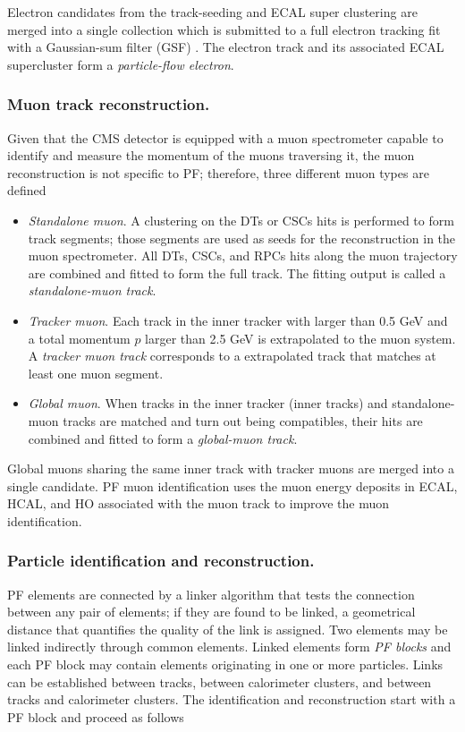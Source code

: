 Electron candidates from the track-seeding and ECAL super clustering are merged into a single collection which is submitted to a full electron tracking fit with a Gaussian-sum filter (GSF) \cite{gsf}. The electron track and its associated ECAL supercluster form a \textit{particle-flow electron}.

\subsubsection*{Muon track reconstruction.}

Given that the CMS detector is equipped with a muon spectrometer capable to identify and measure the momentum of the muons traversing it, the muon reconstruction is not specific to PF; therefore, three different muon types are defined

\begin{itemize}
\item \textit{Standalone muon}. A clustering on the DTs or CSCs hits is performed to form track segments; those segments are used as seeds for the reconstruction in the muon spectrometer. All DTs, CSCs, and RPCs hits along the muon trajectory are combined and fitted to form the full track. The fitting output is called a \textit{standalone-muon track}.
\item \textit{Tracker muon}. Each track in the inner tracker with \pt larger than 0.5 GeV and a total momentum $p$ larger than 2.5 GeV is extrapolated to the muon system. A \textit{tracker muon track} corresponds to a extrapolated track that matches at least one muon segment.
\item \textit{Global muon}. When tracks in the inner tracker (inner tracks) and standalone-muon tracks are matched and turn out being compatibles, their hits are combined and fitted to form a \textit{global-muon track}. 
\end{itemize}

Global muons sharing the same inner track with tracker muons are merged into a single candidate. PF muon identification uses the muon energy deposits in ECAL, HCAL, and HO associated with the muon track to improve the muon identification.

\subsubsection*{Particle identification and reconstruction.}

PF elements are connected by a linker algorithm that tests the connection between any pair of elements; if they are found to be linked, a geometrical distance that quantifies the quality of the link is assigned. Two elements may be linked indirectly through common elements. Linked elements form \textit{PF blocks} and each PF block may contain elements originating in one or more particles. Links can be established between tracks, between calorimeter clusters, and between tracks and calorimeter clusters. The identification and reconstruction start with a PF block and proceed as follows     

